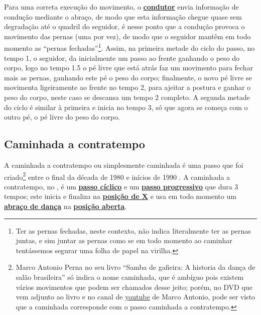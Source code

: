 Para uma correta execução do movimento, 
o \hyperref[def:Condutor]{\textbf{condutor}} envia informação de condução mediante o abraço,
de modo que esta informação chegue quase sem degradação até o quadril do seguidor,
é nesse ponto que a condução provoca o movimento das pernas (uma por vez), de modo que
o seguidor mantêm em todo momento as ``pernas fechadas''\footnote{
Ter as pernas fechadas, neste contexto, não indica literalmente ter as pernas juntas, 
e sim juntar as pernas como se em todo momento ao caminhar tentássemos segurar uma folha de papel na virilha.}.
Assim, na primeira metade do ciclo do passo, no tempo 1, o seguidor,
da inicialmente um passo ao frente ganhando o peso do corpo, 
logo no tempo 1.5 o pé livre que está atrás faz um movimento para fechar mais as pernas, 
ganhando este pé o peso do corpo; finalmente, o novo pé livre se movimenta ligeiramente ao frente no tempo 2, 
para ajeitar a postura e ganhar o peso do corpo, neste caso se descansa um tempo 2 completo.
A segunda metade do ciclo é similar à primeira e inicia no tempo 3, só que agora se começa com o outro pé, 
o pé livre do peso do corpo.\\


\subsection{Caminhada a contratempo}
A caminhada a contratempo ou simplesmente caminhada é
uma passo que foi  criado\footnote{Marco Antonio Perna no seu livro 
``Samba de gafieira: A historia da dança de salão brasileira''
só indica o nome caminhada, que é ambíguo pois existem vários 
movimentos que podem ser chamados desse jeito; porém, no
DVD que vem adjunto ao livro e no canal de 
\href{https://www.youtube.com/watch?v=Bke_poU6NBc}{youtube} de Marco Antonio,
pode ser visto que a caminhada corresponde com o passo caminhada a contratempo.} 
entre o final da década de 1980 e inícios de 1990  \cite[pp. 143]{perna2002samba}.
A caminhada a contratempo, no \AnoLivro, 
é um \hyperref[def:PassoCiclico]{\textbf{passo cíclico}} e 
um \hyperref[def:PassoDeDeslocamento]{\textbf{passo progressivo}} que dura 3 tempos;
este inicia e finaliza na \hyperref[def:X-position]{\textbf{posição de X}} e usa em todo momento 
um \hyperref[def:abracodedanca]{\textbf{abraço de dança}} na 
\hyperref[def:open-position]{\textbf{posição aberta}}.

